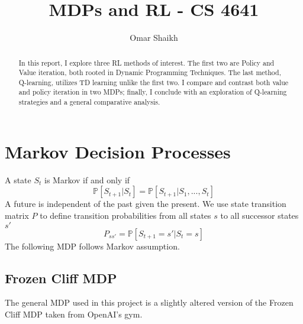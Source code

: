 \documentclass[letter]{article}
\begin{document}
\title{MDPs and RL - CS 4641}
\author{Omar Shaikh}
\maketitle

\begin{abstract}
    In this report, I explore three RL methods of interest. The first two are Policy and Value iteration, both rooted in Dynamic Programming Techniques. The last method, Q-learning, utilizes TD learning unlike the first two. I compare and contrast both value and policy iteration in two MDPs; finally, I conclude with an exploration of Q-learning strategies and a general comparative analysis.
\end{abstract}

\section{Markov Decision Processes}

A state $S_t$ is Markov if and only if
\begin{equation}
\mathbb{P}[S_{t+1}|S_t] = \mathbb{P}[S_{t+1}|S_1, ... , S_t]
\end{equation}
A future is independent of the past given the present. We use state transition matrix $P$ to define transition probabilities from all states $s$ to all successor states $s'$
\begin{equation}
P_{ss'}=\mathbb{P}[S_{t+1}=s'|S_t=s]
\end{equation}
The following MDP follows Markov assumption.

\subsection{Frozen Cliff MDP}

The general MDP used in this project is a slightly altered version of the Frozen Cliff MDP taken from OpenAI's gym.  
\end{document}
